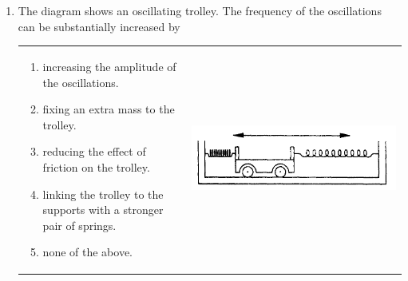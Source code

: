 \documentclass[12pt,letterpaper]{article}
\begin{document}
\begin{enumerate}

\item
The diagram shows an oscillating trolley. The frequency of the oscillations can be substantially increased by

\begin{tabular}{l r}

\begin{minipage}{0.4\textwidth}
\begin{enumerate}
\item increasing the amplitude of the oscillations.
\item fixing an extra mass to the trolley.
\item reducing the effect of friction on the trolley.
\item linking the trolley to the supports with a stronger pair of springs.
\item none of the above.
\end{enumerate}
\end{minipage} &
\begin{minipage}{0.5\textwidth}
\includegraphics[width=\textwidth]{trolley.png}
\end{minipage}
\end{tabular}


\end{enumerate}
\end{document}
